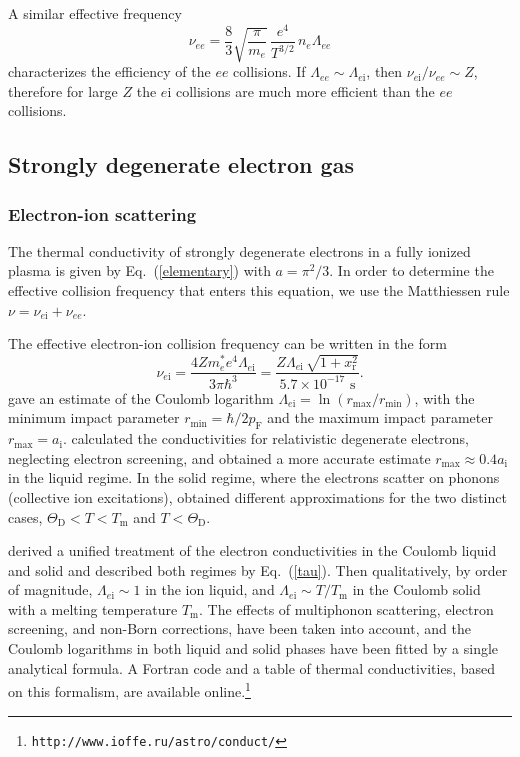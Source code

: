 \documentclass[smallextended]{svjour3}       %
\newcounter{count}
\newcommand{\aion}{a_\mathrm{i}}
\newcommand{\mel}{m_e}
\newcommand{\nel}{n_e}
\newcommand{\pF}{p_\mathrm{F}}
\newcommand{\req}[1]{Eq.~(\ref{#1})}
\newcommand{\Tm}{T_\mathrm{m}}
\newcommand{\xr}{x_\mathrm{r}}
\begin{document}
\begin{appendix}
A similar effective frequency
\begin{equation}
 \nu_{ee} = \frac83 \sqrt{\frac{\pi}{\mel}}\,
\frac{e^4}{T^{3/2}}
 \,\nel \Lambda_{ee}
\label{nu_ee_nondeg}
\end{equation}
characterizes the efficiency of the $ee$ collisions.
If $\Lambda_{ee}\sim\Lambda_{e\mathrm{i}}$, then $\nu_{e\mathrm{i}}/\nu_{ee}\sim Z$,
therefore for large $Z$ the $e\mathrm{i}$ collisions are much more
efficient than the $ee$ collisions.

\subsection{Strongly degenerate electron gas}
\subsubsection{Electron-ion
scattering}
\label{sect:deg}

The thermal conductivity of strongly degenerate electrons in
a fully ionized plasma is given by \req{elementary} with
$a=\pi^2/3$. In order to determine the effective collision
frequency that enters this equation, we use the
Matthiessen rule $\nu=\nu_{e\mathrm{i}}+\nu_{ee}$.

The effective electron-ion collision frequency
can be written in the form \citep{Lee50,YakovlevUrpin80}
\begin{equation}
   \nu_{e\mathrm{i}} = \frac{ 
   4 Z \mel^\ast e^4 \Lambda_{e\mathrm{i}}}{ 3 \pi \hbar^3 }
   =\frac{Z\Lambda_{e\mathrm{i}}
                   \,\sqrt{1+\xr^2}}{5.7\times10^{-17}\mbox{~s}}.
\label{tau}
\end{equation}
\citet{Lee50} gave an estimate of the Coulomb logarithm
$\Lambda_{e\mathrm{i}} = \ln 
(r_\mathrm{max}/r_\mathrm{min})$, with the minimum impact
parameter $r_\mathrm{min} = \hbar/2 \pF$ and the maximum
impact parameter $r_\mathrm{max} = \aion$.
\citet{YakovlevUrpin80} calculated the conductivities for
relativistic degenerate electrons, neglecting electron
screening, and obtained a more accurate estimate
$r_\mathrm{max} \approx 0.4 \aion$ in the liquid regime. In
the solid regime, where the electrons scatter on phonons
(collective ion excitations), \citet{YakovlevUrpin80}
obtained different approximations for the two distinct
cases, $\Theta_\mathrm{D} < T < \Tm$ and $T<
\Theta_\mathrm{D}$.

\citet{Potekhin-ea99} derived a unified treatment of the
electron conductivities in the Coulomb liquid and solid and
described both regimes by \req{tau}. Then qualitatively, by
order of magnitude, $\Lambda_{e\mathrm{i}}\sim1$ in the ion
liquid, and $\Lambda_{e\mathrm{i}}\sim T/T_\mathrm{m}$ in
the Coulomb solid with a melting temperature $T_\mathrm{m}$.
The effects of multiphonon scattering, electron screening,
and non-Born corrections, have been taken into account, and
the Coulomb logarithms in both liquid and solid phases have
been fitted by a single analytical formula. A Fortran code 
and a table of thermal conductivities, based on this
formalism, are available
online.\footnote{\texttt{http://www.ioffe.ru/astro/conduct/}\label{conduct}}


\end{appendix}
\end{document}
